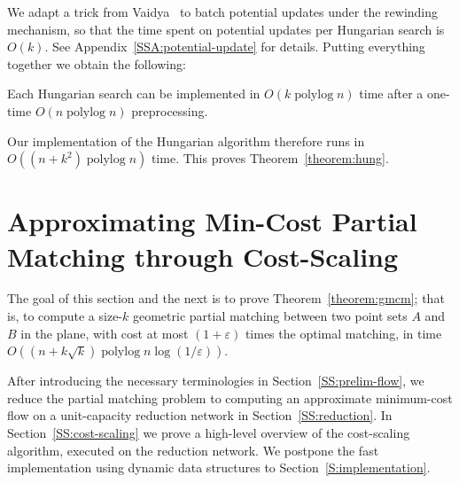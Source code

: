 \documentclass[a4paper,UKenglish]{socg-lipics-v2018}
\makeatletter
\def\polylog{\mathop{\mathrm{polylog}}}
\def\eps{\varepsilon}
\theoremstyle{plain}
\numberwithin{figure}{section}
\def\n@te#1{\textsf{\boldmath \textbf{$\langle\!\langle$#1$\rangle\!\rangle$}}\leavevmode}
\def\note#1{\textcolor{red}{\n@te{#1}}}
\renewcommand{\note}[1]{} %
\makeatother
\begin{document}
We adapt a trick from Vaidya~\cite{Vaidya89} to batch potential updates under the rewinding mechanism,
so that the time spent on potential updates per Hungarian search is $O(k)$.  See Appendix~\ref{SSA:potential-update} for details.
%
Putting everything together we obtain the following:
\begin{lemma}
\label{L:fast-hungarian}
Each Hungarian search can be implemented
in $O(k\polylog n)$ time after a one-time $O(n\polylog n)$ preprocessing.
\end{lemma}

Our implementation of the Hungarian algorithm therefore runs in
$O((n + k^2)\polylog n)$ time.  This proves Theorem~\ref{theorem:hung}.


\section{Approximating Min-Cost Partial Matching through Cost-Scaling}
\label{section:goldberg}

The goal of this section and the next is to prove Theorem~\ref{theorem:gmcm}; that is, to compute a size-$k$ geometric partial matching between two point sets $A$ and $B$ in the plane, with cost at most $(1+\eps)$ times the optimal matching, in time $O((n + k\sqrt{k})\polylog n \log(1/\eps))$.
%
%

After introducing the necessary terminologies in Section~\ref{SS:prelim-flow}, we reduce the partial matching problem to computing an approximate minimum-cost flow on a unit-capacity reduction network in Section~\ref{SS:reduction}.
In Section~\ref{SS:cost-scaling} we prove a high-level overview of the cost-scaling algorithm, executed on the reduction network.
We postpone the fast implementation using dynamic data structures to Section~\ref{S:implementation}.
\end{document}
